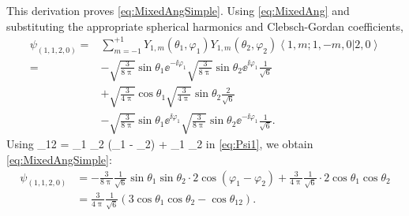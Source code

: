 \documentclass[Dissertation.tex]{subfiles}
\begin{document}
This derivation proves \cref{eq:MixedAngSimple}. Using \cref{eq:MixedAng} and
substituting the appropriate spherical harmonics and Clebsch-Gordan coefficients,
\begin{align}
\label{eq:Psi1}
\psi_{(1,1,2,0)} = &\sum_{m=-1}^{+1} Y_{1,m}(\theta_1,\varphi_1) Y_{1,m}(\theta_2,\varphi_2) \left< 1,m; 1,-m,0 | 2,0 \right> \nonumber \\
	= &-\sqrt{\frac{3}{8\uppi}} \sin\theta_1 \ee^{-\ii \varphi_1} \sqrt{\frac{3}{8\uppi}} \sin\theta_2 \ee^{\ii \varphi_1} \frac{1}{\sqrt{6}} \nonumber \\
	& + \sqrt{\frac{3}{4\uppi}} \cos\theta_1 \sqrt{\frac{3}{4\uppi}} \sin\theta_2 \frac{2}{\sqrt{6}} \nonumber \\
	& -\sqrt{\frac{3}{8\uppi}} \sin\theta_1 \ee^{\ii \varphi_1} \sqrt{\frac{3}{8\uppi}} \sin\theta_2 \ee^{-\ii \varphi_1} \frac{1}{\sqrt{6}}.
\end{align}
Using \cite[p.192]{VanReethThesis}
\beq
\cos\theta_{12} = \sin\theta_1 \sin\theta_2 \cos(\varphi_1 - \varphi_2) + \cos\theta_1 \cos\theta_2
\eeq
in \cref{eq:Psi1}, we obtain \cref{eq:MixedAngSimple}:
\begin{align}
\label{eq:Psi2}
\psi_{(1,1,2,0)} &= -\frac{3}{8\uppi} \frac{1}{\sqrt{6}} \sin\theta_1 \sin\theta_2 \cdot 2 \cos(\varphi_1 - \varphi_2) + \frac{3}{4\uppi} \frac{1}{\sqrt{6}} \cdot 2 \cos\theta_1 \cos\theta_2 \nonumber \\
&= \frac{3}{4\uppi} \frac{1}{\sqrt{6}} \left(3 \cos\theta_1 \cos\theta_2 - \cos\theta_{12} \right).
\end{align}
\end{document}
